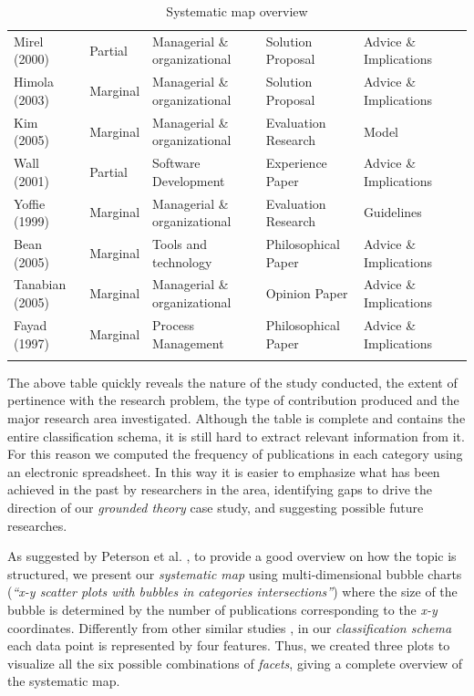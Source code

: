 \documentclass[final,5p,times,twocolumn]{elsarticle}
\begin{document}
{\begin{longtable}{|p{0.5in}|p{0.5in}|p{1.3in}|p{1.1in}|p{1.1in}|p{0.2in}|}
Mirel (2000) & Partial & Managerial \& organizational & Solution Proposal & Advice \& Implications & \cite{Mirel2000} \\
Himola (2003) & Marginal & Managerial \& organizational & Solution Proposal & Advice \& Implications & \cite{Hilmola2003} \\
Kim (2005) & Marginal & Managerial \& organizational & Evaluation Research & Model & \cite{Kim2005} \\
Wall (2001) & Partial & Software Development & Experience Paper & Advice \& Implications & \cite{Wall2001} \\
Yoffie (1999) & Marginal & Managerial \& organizational & Evaluation Research & Guidelines & \cite{Yoffie1999} \\
Bean (2005) & Marginal & Tools and technology & Philosophical Paper & Advice \& Implications & \cite{Bean2005} \\
Tanabian (2005) & Marginal & Managerial \& organizational & Opinion Paper & Advice \& Implications & \cite{Tanabian2005} \\
Fayad (1997) & Marginal & Process Management & Philosophical Paper & Advice \& Implications & \cite{Fayad1997} \\

    \hline \hline

 \caption{ Systematic map overview }\label{tab:ms:refmap}\\
\end{longtable}}


\twocolumn
\small


The above table quickly reveals the nature of the study conducted, the extent of pertinence with the research problem, the type of contribution produced and the major research area investigated. Although the table is complete and contains the entire classification schema, it is still hard to extract relevant information from it. For this reason we computed the frequency of publications in each category using an electronic spreadsheet. In this way it is easier to emphasize what has been achieved in the past by researchers in the area, identifying gaps to drive the direction of our \textit{grounded theory} case study, and suggesting possible future researches.

As suggested by Peterson et al. \cite{Petersen2007}, to provide a good overview on how the topic is structured, we present our \textit{systematic map} using multi-dimensional bubble charts (\textit{``x-y scatter plots with bubbles in categories intersections''}) where the size of the bubble is determined by the number of publications corresponding to the \textit{x-y} coordinates. Differently from other similar studies \cite{Smite2009,Dyba2006}, in our \textit{classification schema} each data point is represented by four features. Thus, we created three plots to visualize all the six possible combinations of \textit{facets}, giving a complete overview of the systematic map.
\end{document}
